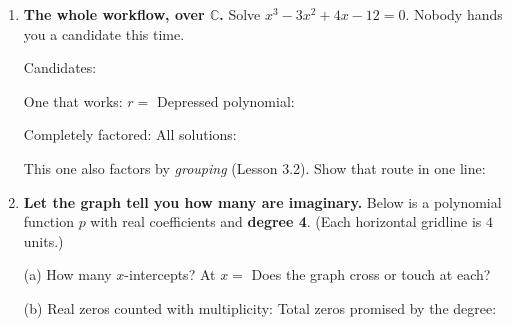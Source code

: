\documentclass[10pt]{article}
\newcommand{\lgrid}[4]{%
  \draw[step=1, linegray!40, very thin] (#1,#3) grid (#2,#4);
  \draw[->, semithick, charcoal] (#1,0)--(#2,0) node[below right, font=\scriptsize]{$x$};
  \draw[->, semithick, charcoal] (0,#3)--(0,#4) node[left, font=\scriptsize]{$y$};}
\begin{document}
\begin{tcolorbox}[colback=white, colframe=black!40, title=\textbf{Tier A --- Approaching Proficiency},
    fonttitle=\bfseries, arc=1.5mm, left=3mm, right=3mm, top=2mm, bottom=2mm, breakable]
\begin{enumerate}[leftmargin=1.7em, itemsep=10pt]
  \item \textbf{The whole workflow, over $\mathbb{C}$.} Solve $x^3 - 3x^2 + 4x - 12 = 0$. Nobody hands
    you a candidate this time.

    \vspace{2pt}
    Candidates: 

    \vspace{2pt}
    One that works: $r = $  \quad Depressed polynomial: 

    \vspace{2pt}
    Completely factored:  \quad All solutions: 

    \vspace{2pt}
    This one also factors by \emph{grouping} (Lesson 3.2). Show that route in one line:

  \item \textbf{Let the graph tell you how many are imaginary.} Below is a polynomial function $p$ with
    real coefficients and \textbf{degree 4}. (Each horizontal gridline is $4$ units.)
    \begin{center}
    \end{center}

    \vspace{2pt}
    (a) How many $x$-intercepts?  \; At $x = $  \; Does the graph cross or
    touch at each? 

    \vspace{2pt}
    (b) Real zeros counted with multiplicity:  \quad Total zeros promised by the degree:


\end{enumerate}
\end{tcolorbox}
\end{document}
